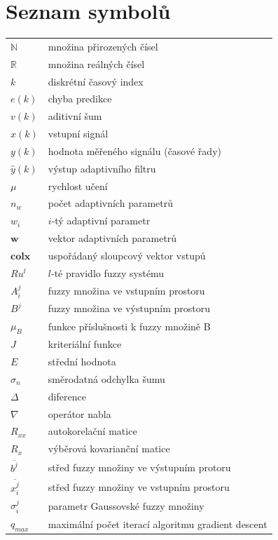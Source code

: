 \cleardoublepage
\thispagestyle{empty}

\chapter*{Seznam symbolů}
\begin{tabular}{ll}
$\mathbb{N}$    & množina přirozených čísel                        \\
$\mathbb{R}$    & množina reálných čísel                          \\
$k$             & diskrétní časový index                       \\
$e(k)$             & chyba predikce              \\
$v(k)$             & aditivní šum              \\
$x(k)$             & vstupní signál                \\
$y(k)$             & hodnota měřeného signálu (časové řady)              \\
$\hat{y}(k)$       & výstup adaptivního filtru                 \\
$\mu$           & rychlost učení                              \\
$n_w$        & počet adaptivních parametrů   \\
$w_i$             & $i$-tý adaptivní parametr                \\
$\textbf{w}$             & vektor adaptivních parametrů                \\
$\textbf{colx}$             & uspořádaný sloupcový vektor vstupů   \\
$Ru^l$             & $l$-té pravidlo fuzzy systému               \\
$A_i^j$             & fuzzy množina ve vstupním prostoru               \\
$B^j$             & fuzzy množina ve výstupním prostoru               \\
$\mu_B$             & funkce příslušnosti k fuzzy množině B       \\
$J$             & kriteriální funkce                \\
$E$             & střední hodnota                \\
$\sigma_n$ & směrodatná odchylka šumu \\
$\Delta$             & diference                \\
$\nabla$             & operátor nabla                \\
$R_{xx}$             & autokorelační matice                \\
$R_x$             & výběrová kovarianční matice               \\
$\overline{b^j}$             & střed fuzzy množiny ve výstupním protoru    \\
$\overline{x_i^j}$        & střed fuzzy množiny ve vstupním prostoru   \\
$\sigma_i^j$             & parametr Gaussovské fuzzy množiny         \\
$q_{max}$            & maximální počet iterací algoritmu gradient descent \\

\end{tabular}

